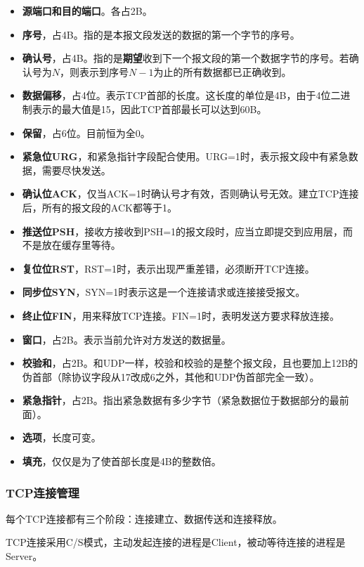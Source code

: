 \documentclass[12pt, a4paper, oneside]{ctexart}
\begin{document}
\begin{itemize}
    \item {\bf 源端口和目的端口}。各占2B。
    \item {\bf 序号}，占4B。指的是本报文段发送的数据的第一个字节的序号。
    \item {\bf 确认号}，占4B。指的是\textbf{期望}收到下一个报文段的第一个数据字节的序号。若确认号为$N$，则表示到序号$N-1$为止的所有数据都已正确收到。
    \item {\bf 数据偏移}，占4位。表示TCP首部的长度。这长度的单位是4B，由于4位二进制表示的最大值是15，因此TCP首部最长可以达到60B。
    \item {\bf 保留}，占6位。目前恒为全0。
    \item {\bf 紧急位URG}，和紧急指针字段配合使用。URG=1时，表示报文段中有紧急数据，需要尽快发送。
    \item {\bf 确认位ACK}，仅当ACK=1时确认号才有效，否则确认号无效。建立TCP连接后，所有的报文段的ACK都等于1。
    \item {\bf 推送位PSH}，接收方接收到PSH=1的报文段时，应当立即提交到应用层，而不是放在缓存里等待。
    \item {\bf 复位位RST}，RST=1时，表示出现严重差错，必须断开TCP连接。
    \item {\bf 同步位SYN}，SYN=1时表示这是一个连接请求或连接接受报文。
    \item {\bf 终止位FIN}，用来释放TCP连接。FIN=1时，表明发送方要求释放连接。
    \item {\bf 窗口}，占2B。表示当前允许对方发送的数据量。
    \item {\bf 校验和}，占2B。和UDP一样，校验和校验的是整个报文段，且也要加上12B的伪首部（除协议字段从17改成6之外，其他和UDP伪首部完全一致）。
    \item {\bf 紧急指针}，占2B。指出紧急数据有多少字节（紧急数据位于数据部分的最前面）。
    \item {\bf 选项}，长度可变。
    \item {\bf 填充}，仅仅是为了使首部长度是4B的整数倍。
\end{itemize}

\subsubsection{TCP连接管理}

每个TCP连接都有三个阶段：连接建立、数据传送和连接释放。

TCP连接采用C/S模式，主动发起连接的进程是Client，被动等待连接的进程是Server。
\end{document}
